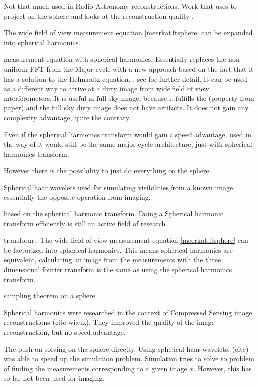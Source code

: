 Not that much used in Radio Astronomy reconstructions. Work that uses to project on the sphere and looks at the reconstruction quality \cite{mcewen2011compressed}.

The wide field of view measurement equation \eqref{meerkat:ftsphere} can be expanded into spherical harmonics.

\cite{carozzi2015imaging} measurement equation with spherical harmonics. Essentially replaces the non-uniform FFT from the Major cycle with a new approach based on the fact that it has a solution to the Helmholtz equation.
, see \cite{carozzi2015imaging} for further detail. It can be used as a different way to arrive at a dirty image from wide field of view interferometers. It is useful in full sky image, because it fulfills the (property from paper) and the full sky dirty image does not have artifacts. It does not gain any complexity advantage, quite the contrary.

Even if the spherical harmonics transform would gain a speed advantage, used in the way of \cite{carozzi2015imaging} it would still be the same major cycle architecture, just with spherical harmonics transform.

However there is the possibility to just do everything on the sphere.

Spherical haar wavelets used for simulating visibilities from a known image, essentially the opposite operation from imaging. \cite{mcewen2008simulating}

based on the spherical harmonic transform. Doing a Spherical harmonic transform efficiently is still an active field of research \cite{schaeffer2013efficient}

transform
. The wide field of view measurement equation \eqref{meerkat:ftsphere} can be factorized into spherical harmonics. This means spherical harmonics are equivalent, calculating an image from the measurements with the three dimensional fourier transform is the same as using the spherical harmonics transform. \cite{shaw2014all}

\cite{mcewen2013sparse}sampling theorem on a sphere



Spherical harmonics were researched in the context of Compressed Sensing image reconstructions (cite wiaux). They improved the quality of the image reconstruction, but no speed advantage.

The push on solving on the sphere directly. Using spherical haar wavelets, (cite) was able to speed up the simulation problem. Simulation tries to solve to problem of finding the measurements corresponding to a given image $x$. However, this has so far not been used for imaging.



